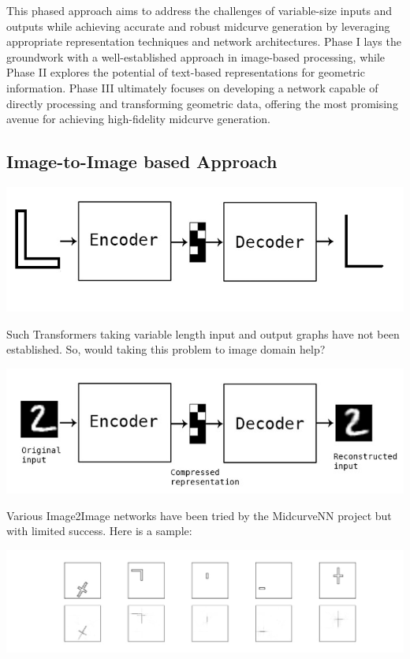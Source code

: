 \documentclass[10pt, conference]{IEEEtran}
\begin{document}
This phased approach aims to address the challenges of variable-size inputs and outputs while achieving accurate and robust midcurve generation by leveraging appropriate representation techniques and network architectures. Phase I lays the groundwork with a well-established approach in image-based processing, while Phase II explores the potential of text-based representations for geometric information. Phase III ultimately focuses on developing a network capable of directly processing and transforming geometric data, offering the most promising avenue for achieving high-fidelity midcurve generation.

\subsection{Image-to-Image based Approach}
\label{subsec:6}

     \begin{center}
	\includegraphics[width=0.8\linewidth]{images/midcurve26}
	 \cite{midcurvenn2022}
	\label{fig_ecd}
    \end{center}

Such Transformers taking variable length input and output graphs have not been established. So, would taking this problem to image domain help?

     \begin{center}
	\includegraphics[width=0.8\linewidth]{images/midcurve25}
	 \cite{autoenkeras}
	\label{fig_autoecd}
    \end{center}
    
    Various Image2Image networks have been tried by the MidcurveNN project but with limited success. Here is a sample:
    
         \begin{center}
	\includegraphics[width=\linewidth]{images/midcurvenn_simpleencoderdecoder}
	 \cite{midcurvenngithub}
	\label{fig_simpleecd}
    \end{center}
    
\end{document}
